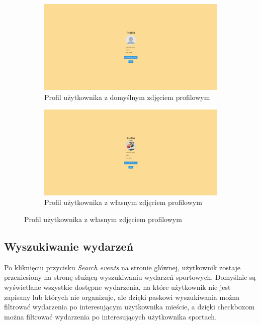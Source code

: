 \documentclass[11pt,a4paper]{article}
\begin{document}
\begin{figure}[H]
    \centering
    \captionsetup{justification=centering,margin=2cm}
        \begin{subfigure}{0.49\textwidth}
            \includegraphics[width=\textwidth]{pages/account.png}
            \caption{Profil użytkownika z domyślnym zdjęciem profilowym}
        \end{subfigure}
    \hfill
        \begin{subfigure}{0.49\textwidth}
            \includegraphics[width=\textwidth]{pages/account_with_profile_picture.png}
            \caption{Profil użytkownika z własnym zdjęciem profilowym}
        \end{subfigure}
\end{figure}

\subsection{Wyszukiwanie wydarzeń}

Po kliknięciu przycisku \textit{Search events} na stronie głównej, użytkownik zostaje przeniesiony na stronę służącą wyszukiwaniu wydarzeń sportowych. Domyślnie są wyświetlane wszystkie dostępne wydarzenia, na które użytkownik nie jest zapisany lub których nie organizuje, ale dzięki paskowi wyszukiwania można filtrować wydarzenia po interesującym użytkownika mieście, a dzięki checkboxom można filtrować wydarzenia po interesujących użytkownika sportach.
\end{document}
